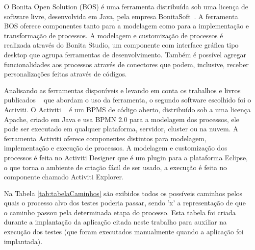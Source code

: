 \documentclass[12pt]{article}
\begin{document}
O Bonita Open Solution (BOS) é uma ferramenta distribuída sob uma licença de software livre, desenvolvida em Java, pela empresa BonitaSoft~\cite{BONITASOFT}. A ferramenta BOS oferece componentes tanto para a modelagem como para a implementação e transformação de processos. A modelagem e customização de processos é realizada através do Bonita Studio, um componente com interface gráfica tipo desktop que agrupa ferramentas de desenvolvimento. Também é possível agregar funcionalidades aos processos através de conectores que podem, inclusive, receber personalizações feitas através de códigos.

Analisando as ferramentas disponíveis e levando em conta os trabalhos e livros publicados ~\cite{rademakers2012activiti} que abordam o uso da ferramenta, o segundo software escolhido foi o Activiti. O Activiti ~\cite{ACTIVITI} é um BPMS de código aberto, distribuído sob a uma licença Apache, criado em Java e usa  BPMN 2.0 para a modelagem dos processos, ele pode ser executado em qualquer plataforma, servidor, cluster ou na nuvem. A ferramenta Activiti oferece componentes distintos para modelagem, implementação e execução de processos. A modelagem e customização dos processos é feita no Activiti Designer que é um plugin para a plataforma Eclipse, o que torna o ambiente de criação fácil de ser usado, a execução é feita no componente chamado Activiti Explorer.


Na Tabela \ref{tab:tabelaCaminhos} são exibidos todos os possíveis caminhos pelos quais o processo alvo dos testes poderia passar, sendo 'x' a representação de que o caminho passou pela determinada etapa do processo. Esta tabela foi criada durante a implantação da aplicação citada neste trabalho para auxiliar na execução dos testes (que foram executados manualmente quando a aplicação foi implantada).
\end{document}
